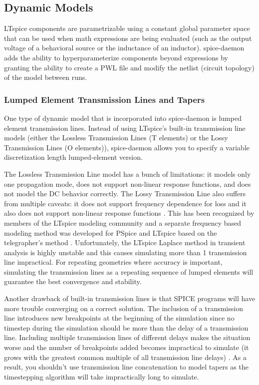 \subsection{Dynamic Models} \label{dyn_models}

LTspice components are parametrizable using a constant global parameter space that can be used when
math expressions are being evaluated (such as the output voltage of a behavioral source or the inductance 
of an inductor). spice-daemon adds the ability to hyperparameterize components beyond expressions by granting the
ability to create a PWL file and modify the netlist (circuit topology) of the model between runs.

\subsubsection{Lumped Element Transmission Lines and Tapers}\label{tapers_section}

One type of dynamic model that is incorporated into spice-daemon is lumped 
element transmission lines. Instead of using LTspice's built-in transmission
line models (either the Lossless Transmission Lines (T elements) or the 
Lossy Transmission Lines (O elements)), spice-daemon allows you to specify a
variable discretization length lumped-element version. 

The Lossless Transmission Line model has a bunch of limitations: it models only one propagation mode,
 does not support non-linear response functions, and does not 
model the DC behavior correctly. The Lossy Transmission Line also suffers from multiple caveats:
it does not support frequency dependence for loss and it also does not support non-linear response 
functions \cite{ltwiki_tline_issues}. This has been recognized by members of the 
LTspice modeling community and a separate frequency based modeling method was developed
for PSpice and LTspice based on the telegrapher's method \cite{camron_model_tline}. Unfortunately, the LTspice
Laplace method in transient analysis is highly unstable and this causes simulating 
more than 1 transmission line impractical. For repeating geometries where accuracy is important, simulating the
transmission lines as a repeating sequence of lumped elements will guarantee the best
convergence and stability.

Another drawback of built-in transmission lines is that 
SPICE programs will have more trouble converging on a correct solution. 
The inclusion of a transmission line introduces new breakpoints at the beginning of the simulation since no timestep during the simulation should be more than the delay of a
transmission line. Including multiple transmission lines of different delays makes the 
situation worse and the number of breakpoints added becomes impractical to simulate (it grows with the 
greatest common multiple of all transmission line delays) \cite{spice-book}.
As a result, you shouldn't use transmission line concatenation to model tapers
as the timestepping algorithm will take impractically long to simulate.

